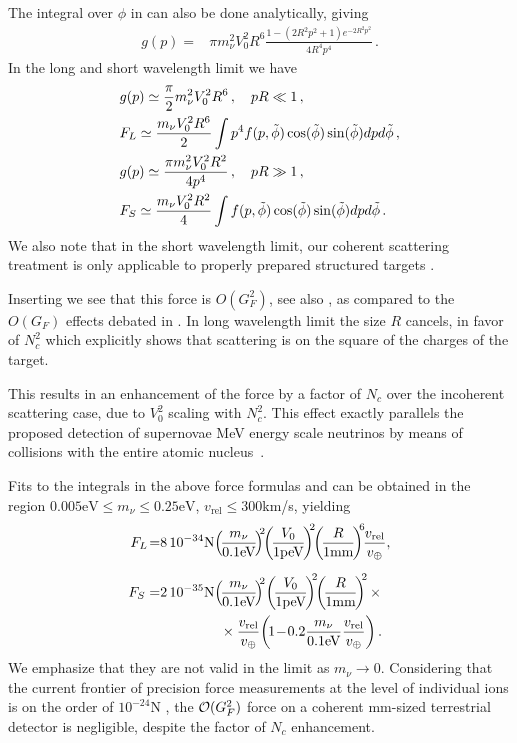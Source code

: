 The integral over $\phi$ in  can also be done analytically, giving
\begin{align}
g(p)=&\pi m_\nu^2V_0^2R^6\frac{1-(2R^2p^2+1)e^{-2R^2p^2}}{4R^4p^4}\,.
\end{align}
 In the long and short wavelength limit we have 
\begin{align}
\label{longWaveDrag}
&g(p)\simeq\frac{\pi}{2} m_\nu^2V_0^2R^6\,,\quad pR\ll 1\,,\\
&F_L\simeq \frac{m_\nu V_0^2R^6}{2} \int p^4 f(p,\tilde\phi) \cos(\tilde\phi) \sin(\tilde\phi) dpd\tilde\phi\,,\notag\\
\label{shortWaveDrag}
&g(p)\simeq\frac{\pi m_\nu^2V_0^2R^2}{4p^4}\,, 
\quad pR\gg 1\,,\\
&F_S\simeq \frac{ m_\nu V_0^2R^2}{4} \int f(p,\tilde\phi) \cos(\tilde\phi) \sin(\tilde\phi) dpd\tilde\phi\notag\,.
\end{align}
 We also note that in the short wavelength limit, our coherent scattering treatment is only applicable to properly prepared structured targets \cite{Liao:2012wb}.

Inserting  we see that this force is $O(G_F^2)$, see also \cite{Shvartsman,Smith:1983jj,Gelmini:2004hg}, as compared to the $O(G_F)$ effects debated in  \cite{Opher:1974drq,Lewis:1979mu,Opher2,Cabibbo:1982bb,Langacker:1982ih,Smith:1983jj,Ferreras:1995wf}. In long wavelength limit the size $R$ cancels, in favor of $N_c^2$ which explicitly shows that scattering is on the square of the charges of the target. 

This results in an enhancement of the force by a factor of $N_c$ over the incoherent scattering case, due to $V_0^2$ scaling with $N_c^2$. This effect exactly parallels the proposed detection of supernovae MeV energy scale neutrinos by means of collisions with the entire atomic nucleus~\cite{Divari:2012zz}.  

Fits to the integrals in the above force formulas  and  can be obtained in the region $0.005 \text{eV}\leq m_\nu\leq 0.25\text{eV}$, $v_\text{rel}\leq 300$km/s, yielding
\begin{align}\label{FL}
F_L\!=&8\,10^{-34}{\rm N}\!\left(\!\frac{m_\nu}{0.1 \text{eV}}\!\right)^{\!\!2}\!\! \left(\!\frac{V_0}{1\text{peV}}\!\right)^{\!\!2}\!\!\left(\!\frac{R}{1\text{mm}}\!\right)^{\!\! 6} \!\!\frac{v_{\text{rel}}}{v_\oplus},\\[0.2cm]
F_S=&2\, 10^{-35}{\rm N}\!\left(\!\frac{m_\nu}{0.1\text{eV}}\!\right)^{\!\!2}\! \left(\!\frac{V_0}{1\text{peV}}\!\right)^{\!\!2}\!\!\left(\!\frac{R}{1\text{mm}}\!\right)^{\!\!2}\times\notag \\
&\hspace*{1.5cm}\times\frac{v_{\text{rel}}}{v_\oplus}\!\left(\!1\!-\!0.2\frac{m_\nu}{0.1\text{eV}}\frac{v_{\text{rel}}}{v_\oplus}\right).
\end{align}
We emphasize that they are not valid in the limit as $m_\nu\rightarrow 0$. Considering that the current frontier of precision force measurements at the level of individual ions is on the order of $10^{-24}$N \cite{Biercuk}, the ${\cal O}(G_F^2)$ force on a coherent mm-sized terrestrial detector is negligible, despite the factor of $N_c$ enhancement. 

